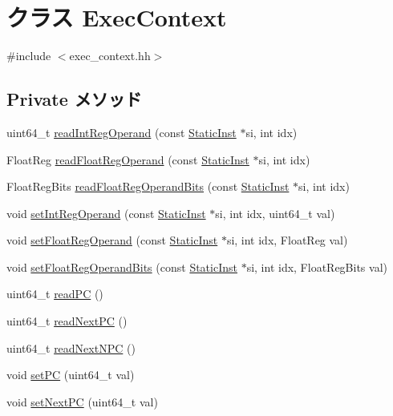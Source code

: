 \hypertarget{classExecContext}{
\section{クラス ExecContext}
\label{classExecContext}
}


{\ttfamily \#include $<$exec\_\-context.hh$>$}\subsection*{Private メソッド}
\begin{DoxyCompactItemize}
\item 
uint64\_\-t \hyperlink{classExecContext_a9e7b0a4d5373c48902425c9456b19e7e}{readIntRegOperand} (const \hyperlink{classStaticInst}{StaticInst} $\ast$si, int idx)
\item 
FloatReg \hyperlink{classExecContext_a717c88c8c56d79c9ed554ba5992bd8c3}{readFloatRegOperand} (const \hyperlink{classStaticInst}{StaticInst} $\ast$si, int idx)
\item 
FloatRegBits \hyperlink{classExecContext_a39d93624e4481f4a210f2c46ea6b15b0}{readFloatRegOperandBits} (const \hyperlink{classStaticInst}{StaticInst} $\ast$si, int idx)
\item 
void \hyperlink{classExecContext_a654e99f2be7cd298378462ce9651bb44}{setIntRegOperand} (const \hyperlink{classStaticInst}{StaticInst} $\ast$si, int idx, uint64\_\-t val)
\item 
void \hyperlink{classExecContext_addc8b4b6511725bf8ff48bd09ef22892}{setFloatRegOperand} (const \hyperlink{classStaticInst}{StaticInst} $\ast$si, int idx, FloatReg val)
\item 
void \hyperlink{classExecContext_a80a516966713c873cf964af7538dbd37}{setFloatRegOperandBits} (const \hyperlink{classStaticInst}{StaticInst} $\ast$si, int idx, FloatRegBits val)
\item 
uint64\_\-t \hyperlink{classExecContext_a30cb2afdfdc1383b7804c167dcf5ee78}{readPC} ()
\item 
uint64\_\-t \hyperlink{classExecContext_acac7689eb460c7ab0e23797c198b7028}{readNextPC} ()
\item 
uint64\_\-t \hyperlink{classExecContext_a1c4619d610f95bf0728b5bfb0333507c}{readNextNPC} ()
\item 
void \hyperlink{classExecContext_a27cf930ee8c23222a063cdc302aa0efb}{setPC} (uint64\_\-t val)
\item 
void \hyperlink{classExecContext_ac01bbbec5b2a7338e18d05322ba78cd3}{setNextPC} (uint64\_\-t val)

\end{DoxyCompactItemize}
